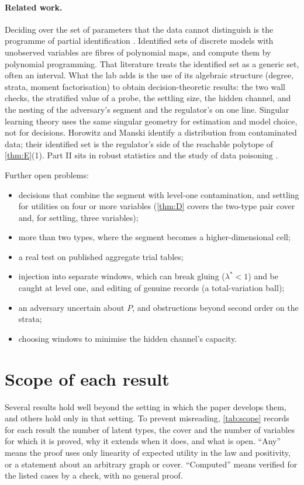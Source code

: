 \documentclass[11pt]{article}
\theoremstyle{definition}\newtheorem{definition}{Definition}\newtheorem{remark}{Remark}
\begin{document}
\paragraph{Related work.} Deciding over the set of parameters that the data cannot distinguish is the programme of partial
identification \cite{Manski2000,Stoye2009,GiacominiKitagawa2021,MontielOleaQiuStoye2023,Manski2025}. Identified sets of discrete models with
unobserved variables are fibres of polynomial maps, and \cite{DuarteEtAl2024} compute them by polynomial programming. That literature
treats the identified set as a generic set, often an interval. What the lab adds is the use of its algebraic structure (degree, strata,
moment factorisation) to obtain decision-theoretic results: the two wall checks, the stratified value of a probe, the settling size,
the hidden channel, and the nesting of the adversary's segment and the regulator's on one line. Singular learning theory \cite{Watanabe2009,DrtonPlummer2017} uses the same singular geometry for estimation
and model choice, not for decisions. Horowitz and Manski \cite{HorowitzManski1995} identify a distribution from contaminated data; their identified set is the
regulator's side of the reachable polytope of \cref{thm:E}(1). Part II sits in robust statistics \cite{Huber1964,Hampel1974} and the study of data poisoning
\cite{BiggioNelsonLaskov2012,SteinhardtKohLiang2017,DiakonikolasEtAl2019}.

Further open problems:
\begin{itemize}
\item decisions that combine the segment with level-one contamination, and settling for utilities on four or more variables
  (\cref{thm:D} covers the two-type pair cover and, for settling, three variables);
\item more than two types, where the segment becomes a higher-dimensional cell;
\item a real test on published aggregate trial tables;
\item injection into separate windows, which can break gluing ($\lambda^*<1$) and be caught at level one, and editing of genuine records
  (a total-variation ball);
\item an adversary uncertain about $P$, and obstructions beyond second order on the strata;
\item choosing windows to minimise the hidden channel's capacity.
\end{itemize}

\section{Scope of each result}\label{sec:scope}
Several results hold well beyond the setting in which the paper develops them, and others hold only in that setting. To prevent
misreading, \cref{tab:scope} records for each result the number of latent types, the cover and the number of variables for which it is
proved, why it extends when it does, and what is open. ``Any'' means the proof uses only linearity of expected utility in the law and
positivity, or a statement about an arbitrary graph or cover. ``Computed'' means verified for the listed cases by a check, with no
general proof.
\end{document}
